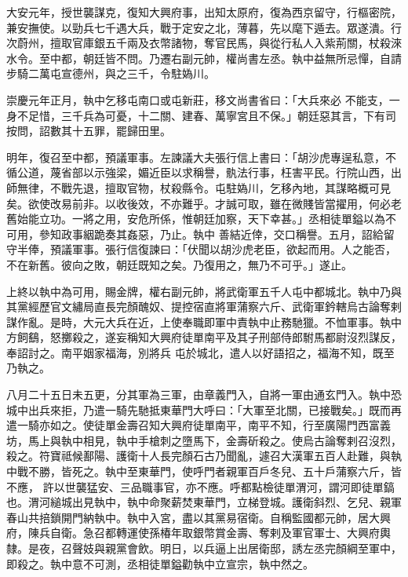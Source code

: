 \begin{pinyinscope}
 大安元年，授世襲謀克，復知大興府事，出知太原府，復為西京留守，行樞密院，兼安撫使。以勁兵七千遇大兵，戰于定安之北，薄暮，先以麾下遁去。眾遂潰。行次蔚州，擅取官庫銀五千兩及衣幣諸物，奪官民馬，與從行私人入紫荊關，杖殺淶水令。至中都，朝廷皆不問。乃遷右副元帥，權尚書左丞。執中益無所忌憚，自請步騎二萬屯宣德州，與之三千，令駐媯川。



 崇慶元年正月，執中乞移屯南口或屯新莊，移文尚書省曰：「大兵來必
 不能支，一身不足惜，三千兵為可憂，十二關、建春、萬寧宮且不保。」朝廷惡其言，下有司按問，詔數其十五罪，罷歸田里。



 明年，復召至中都，預議軍事。左諫議大夫張行信上書曰：「胡沙虎專逞私意，不循公道，蔑省部以示強梁，媚近臣以求稱譽，骫法行事，枉害平民。行院山西，出師無律，不戰先退，擅取官物，杖殺縣令。屯駐媯川，乞移內地，其謀略概可見矣。欲使改易前非。以收後效，不亦難乎。才誠可取，雖在微賤皆當擢用，何必老舊始能立功。一將之用，安危所係，惟朝廷加察，天下幸甚。」丞相徒單鎰以為不可用，參知政事絪跪奏其姦惡，乃止。執中
 善結近倖，交口稱譽。五月，詔給留守半俸，預議軍事。張行信復諫曰：「伏聞以胡沙虎老臣，欲起而用。人之能否，不在新舊。彼向之敗，朝廷既知之矣。乃復用之，無乃不可乎。」遂止。



 上終以執中為可用，賜金牌，權右副元帥，將武衛軍五千人屯中都城北。執中乃與其黨經歷官文繡局直長完顏醜奴、提控宿直將軍蒲察六斤、武衛軍鈐轄烏古論奪剌謀作亂。是時，大元大兵在近，上使奉職即軍中責執中止務馳獵。不恤軍事。執中方飼鷂，怒擲殺之，遂妄稱知大興府徒單南平及其子刑部侍郎駙馬都尉沒烈謀反，奉詔討之。南平姻家福海，別將兵
 屯於城北，遣人以好語招之，福海不知，既至乃執之。



 八月二十五日未五更，分其軍為三軍，由章義門入，自將一軍由通玄門入。執中恐城中出兵來拒，乃遣一騎先馳抵東華門大呼曰：「大軍至北關，已接戰矣。」既而再遣一騎亦如之。使徒單金壽召知大興府徒單南平，南平不知，行至廣陽門西富義坊，馬上與執中相見，執中手槍刺之墮馬下，金壽斫殺之。使烏古論奪剌召沒烈，殺之。符寶祗候鄯陽、護衛十人長完顏石古乃聞亂，遽召大漢軍五百人赴難，與執中戰不勝，皆死之。執中至東華門，使呼門者親軍百戶冬兒、五十戶蒲察六斤，皆不應，
 許以世襲猛安、三品職事官，亦不應。呼都點檢徒單渭河，謂河即徒單鎬也。渭河縋城出見執中，執中命聚薪焚東華門，立梯登城。護衛斜烈、乞兒、親軍春山共掊鎖開門納執中。執中入宮，盡以其黨易宿衛。自稱監國都元帥，居大興府，陳兵自衛。急召都轉運使孫椿年取銀幣賞金壽、奪剌及軍官軍士、大興府輿隸。是夜，召聲妓與親黨會飲。明日，以兵逼上出居衛邸，誘左丞完顏綱至軍中，即殺之。執中意不可測，丞相徒單鎰勸執中立宣宗，執中然之。




\end{pinyinscope}
